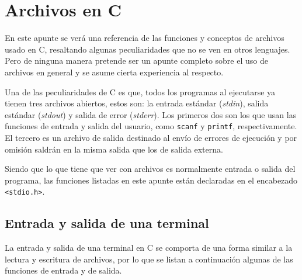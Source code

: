 
%

\renewcommand{\chaptermark}[1]{\markboth{#1}{}}
\renewcommand{\thesection}{\arabic{section}}
\chapter*{Archivos en C}

En este apunte se verá una referencia de las funciones y conceptos de archivos
usado en C, resaltando algunas peculiaridades que no se ven en otros
lenguajes. Pero de ninguna manera pretende ser un apunte completo sobre el uso
de archivos en general y se asume cierta experiencia al respecto.

Una de las peculiaridades de C es que, todos los programas al ejecutarse ya
tienen tres archivos abiertos, estos son: la entrada estándar
(\textit{stdin}), salida estándar (\textit{stdout}) y salida de error
(\textit{stderr}). Los primeros dos son los que usan las funciones de entrada
y salida del usuario, como \lstinline!scanf!  y \lstinline!printf!,
respectivamente. El tercero es un archivo de salida destinado al envío de
errores de ejecución y por omisión saldrán en la misma salida que los de
salida externa.

Siendo que lo que tiene que ver con archivos es normalmente entrada o salida
del programa, las funciones listadas en este apunte están declaradas en el
encabezado \lstinline!<stdio.h>!.

\section{Entrada y salida de una terminal}

La entrada y salida de una terminal en C se comporta de una forma similar a la
lectura y escritura de archivos, por lo que se listan a continuación algunas
de las funciones de entrada y de salida.

